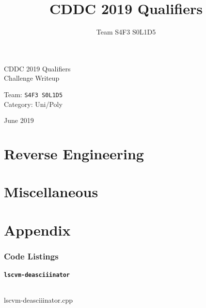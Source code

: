 \documentclass[12pt]{article}
\title{CDDC 2019 Qualifiers}
\author{Team S4F3 S0L1D5}
\begin{document}
\hypersetup{pageanchor=false}
\begin{center}

	\vspace*{5mm}

	\begin{flushleft}

	{
		\Roboto\fontsize{36pt}{48pt}\selectfont CDDC 2019 Qualifiers \\
		\Roboto\fontsize{28pt}{40pt}\selectfont Challenge Writeup

		\vfill

		\normalfont\fontsize{20pt}{24pt}\selectfont Team:    \tabto{30mm} \fontsize{24pt}{24pt}\selectfont \texttt{S4F3 S0L1D5} \\
		\normalfont\fontsize{20pt}{24pt}\selectfont Category:\tabto{30mm} Uni/Poly

		\vspace{5mm}
		\normalfont\fontsize{16pt}{20pt}\selectfont June 2019
		\vspace{30mm}
	}

	\end{flushleft}


\end{center}


\pagebreak
{}
\hypersetup{pageanchor=true}

\pagebreak\part{Reverse Engineering}


\pagebreak\part{Miscellaneous}



\makeatletter{}\makeatother
\pagebreak\part{Appendix}
\section{Code Listings}

	\subsection{\texttt{lscvm-deasciiinator}}
		\vspace{\baselineskip}
		\begin{multipagecode}
			\inputminted[xleftmargin=0.075\textwidth,xrightmargin=0.075\textwidth,frame=leftline,framesep=4mm,framerule=0.4mm,
	linenos=true]{cpp}{../lscvm/lscvm-deasciiinator.cpp}
			\caption{lscvm-deasciiinator.cpp}
			\label{code:lscvm-deasciiinator}
		\end{multipagecode}
\end{document}
